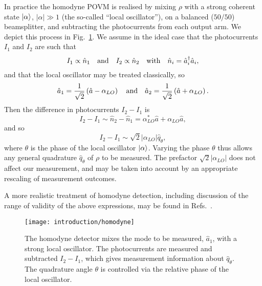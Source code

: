 \noindent In practice the homodyne POVM is realised by mixing $\rho$ with a strong coherent state $\ket{\alpha}$, $\left|\alpha\right| \gg 1$ (the so-called ``local oscillator''), on a balanced ($50/50$) beamsplitter, and subtracting the photocurrents from each output arm. We depict this process in Fig.~\ref{fig:intro_homodyne}. We assume in the ideal case that the photocurrents $I_1$ and $I_2$ are such that
\begin{equation}
I_1 \propto \hat{n}_1 \qq{and} I_2 \propto \hat{n}_2 \qq{with} \hat{n}_i = \hat{a}_i^\dagger \hat{a}_i,
\end{equation}
and that the local oscillator may be treated classically, so
\begin{equation}
\hat{a}_1 = \frac{1}{\sqrt{2}} \left(\hat{a} - \alpha_{LO}\right) \qq{and} \hat{a}_2 = \frac{1}{\sqrt{2}}\left(\hat{a} + \alpha_{LO}\right).
\end{equation}
Then the difference in photocurrents $I_2 - I_1$ is
\begin{equation}
I_2 - I_1 \sim \hat{n}_2 - \hat{n}_1 = \alpha_{LO}^* \hat{a} + \alpha_{LO}\hat{a},
\end{equation}
and so
\begin{equation}
I_2 - I_1 \sim \sqrt{2} \left|\alpha_{LO}\right| \hat{q}_\theta,
\end{equation}
where $\theta$ is the phase of the local oscillator $\ket{\alpha}$. Varying the phase $\theta$ thus allows any general quadrature $\hat{q}_\theta$ of $\rho$ to be measured. The prefactor $\sqrt{2}\left|\alpha_{LO}\right|$ does not affect our measurement, and may be taken into account by an appropriate rescaling of measurement outcomes.

A more realistic treatment of homodyne detection, including discussion of the range of validity of the above expressions, may be found in Refs.~\cite{Leonhardt1997, Serafini2019}.


\begin{figure}[htp]
\centering
\captionsetup{width=0.8\linewidth}
\texttt{[image: introduction/homodyne]}
\caption{\label{fig:intro_homodyne} The homodyne detector mixes the mode to be measured, $\hat{a}_1$, with a strong local oscillator. The photocurrents are measured and subtracted $I_2 - I_1$, which gives measurement information about $\hat{q}_\theta$. The quadrature angle $\theta$ is controlled via the relative phase of the local oscillator.}
\end{figure}



